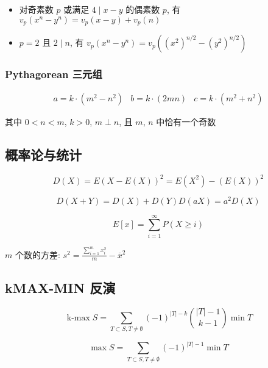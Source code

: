\begin{itemize}
    \item 对奇素数 \(p\) 或满足 \(4\mid x-y\) 的偶素数 \(p\), 有 \(v_p\left(x^n-y^n\right)=v_p(x-y)+v_p(n)\)
    \item \(p=2\) 且 \(2\mid n\), 有 \(v_p\left(x^n-y^n\right)=v_p\left(\left(x^2\right)^{n/2}-\left(y^2\right)^{n/2}\right)\)
\end{itemize}

\subsubsection{Pythagorean 三元组}

\[
    \begin{array}{ccc}
        a=k\cdot\left(m^2-n^2\right) & b=k\cdot\left(2mn\right) & c=k\cdot\left(m^2+n^2\right)
    \end{array}
\]

其中 \(0<n<m\), \(k>0\), \(m\perp n\), 且 \(m\), \(n\) 中恰有一个奇数

\subsection{概率论与统计}

\begin{equation}
    D(X)=E(X-E(X))^2=E\left(X^2\right)-(E(X))^2
\end{equation}

\begin{equation}
    D(X+Y)=D(X)+D(Y)D(aX)=a^2D(X)
\end{equation}

\begin{equation}
    E[x]=\sum_{i=1}^{\infty}P(X\geq i)
\end{equation}

\(m\) 个数的方差: \(\displaystyle s^2=\frac{\sum_{i=1}^m x_i^2}m-\overline x^2\)

\subsection{kMAX-MIN 反演}

\begin{equation}
    \operatorname{k-max} S=\sum_{T\subset S, T\neq \emptyset}(-1)^{|T|-k}\binom{|T|-1}{k-1}\min T
\end{equation}

\begin{equation}
    \max S=\sum_{T\subset S, T\neq \emptyset}(-1)^{|T|-1}\min T
\end{equation}

